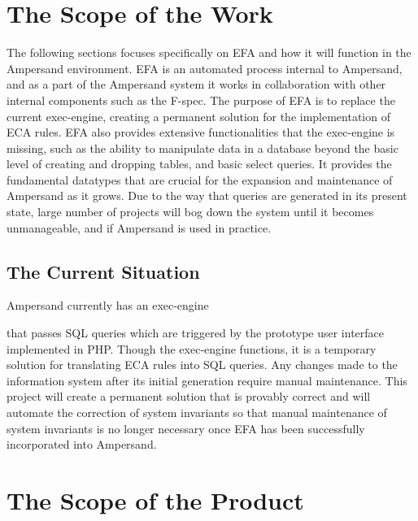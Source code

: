 \documentclass[12pt]{report}
\begin{document}
\section{The Scope of the Work}\label{sec:ScopeOfWork}
The following sections focuses specifically on EFA and how it will 
function in the Ampersand environment.
EFA is an automated process internal to Ampersand, and as a part of the 
Ampersand system it works in collaboration with other internal components such 
as the F-spec. The purpose of EFA is to replace the current exec-engine,
creating a permanent solution for the implementation of ECA rules. EFA also 
provides extensive functionalities that the exec-engine is missing, such as the 
ability to manipulate data in a database beyond the basic level of creating and 
dropping tables, and basic select queries. It provides the fundamental 
datatypes that are crucial for the expansion and maintenance of Ampersand as it 
grows. Due to the way that queries are generated in its present state, large 
number of projects will bog down the system until it becomes unmanageable, and 
if Ampersand is used in practice.

\subsection{The Current Situation} %

Ampersand currently has an exec-engine 

that passes SQL queries which are 
triggered by the prototype user interface implemented in PHP. Though the 
exec-engine functions, it is a temporary solution for translating ECA rules 
into SQL queries. Any changes made to the information system after its initial 
generation require manual maintenance. This project will create a permanent 
solution that is provably correct and will automate the correction of system 
invariants so that manual maintenance of system invariants is no longer 
necessary once EFA has been successfully incorporated into Ampersand.

\section{The Scope of the Product}\label{sec:ScopeOfProduct}
\end{document}

